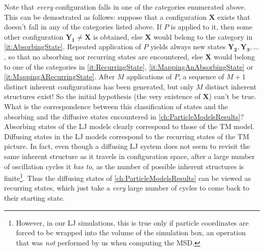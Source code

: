 Note that \emph{every} configuration falls in one of the categories enumerated above.
This can be demostrated as follows: suppose that a configuration $\mathbf{X}$ exists that doesn't fall in any of the categories listed above. If $P$ is applied to it, then some other configuration $\mathbf{Y_{1}} \neq \mathbf{X}$ is obtained, else $\mathbf{X}$ would belong to the category in \autoref{it:AbsorbingState}. Repeated application of $P$ yields always new states $\mathbf{Y_{2}}, \mathbf{Y_{3}}, \ldots$, so that no absorbing nor recurring states are encountered, else $\mathbf{X}$ would belong to one of the categories in \autoref{it:RecurringState}, \autoref{it:MappingAnAbsorbingState} or \autoref{it:MappingARecurringState}. After $M$ applications of $P$, a sequence of $M+1$ distinct inherent configurations has been generated, but only $M$ distinct inherent structures exist! So the initial hypothesis (the very existence of $\mathbf{X}$) can't be true.\\
What is the correspondence between this classification of states and the absorbing and the diffusive states encountered in \autoref{ch:ParticleModelsResults}? Absorbing states of the LJ models clearly correspond to those of the TM model. Diffusing states in the LJ models correspond to the recurring states of the TM picture. In fact, even though a diffusing LJ system does not seem to revisit the same inherent structure as it travels in configuration space, after a large number of oscillation cycles it \emph{has to}, as the number of possible inherent structures is finite\footnote{However, in our LJ simulations, this is true only if particle coordinates are forced to be wrapped into the volume of the simulation box, an operation that was \emph{not} performed by us when computing the MSD.}. Thus the diffusing states of \autoref{ch:ParticleModelsResults} can be viewed as recurring states, which just take a \emph{very} large number of cycles to come back to their starting state. 

